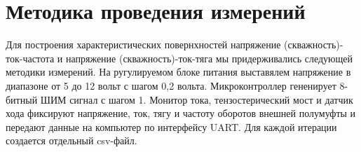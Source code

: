 \documentclass[12pt, twoside]{article}
\begin{document}
\section{Методика проведения измерений}

Для построения характеристических повернхностей напряжение (скважность)-ток-частота и напряжение (скважность)-ток-тяга мы придерживались следующей методики измерений. 
На ругулируемом блоке питания выставялем напряжение в диапазоне от 5 до 12 вольт с шагом 0,2 вольта. Микроконтроллер гененирует 8-битный ШИМ сигнал с шагом 1. 
Монитор тока, тензостерический мост и датчик хода фиксируют напряжение, ток, тягу и частоту оборотов внешней полумуфты и передают данные на компьютер по интерфейсу UART. 
Для каждой итерации создается отдельный csv-файл.



\end{document}
